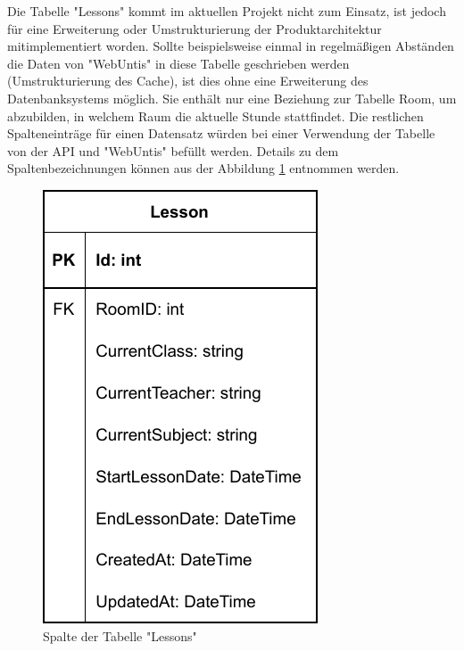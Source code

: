 
Die Tabelle "Lessons" kommt im aktuellen Projekt nicht zum Einsatz, ist jedoch für eine Erweiterung oder Umstrukturierung der Produktarchitektur mitimplementiert worden. Sollte beispielsweise einmal in regelmäßigen Abständen die Daten von "WebUntis" in diese Tabelle geschrieben werden (Umstrukturierung des Cache), ist dies ohne eine Erweiterung des Datenbanksystems möglich. Sie enthält nur eine Beziehung zur Tabelle Room, um abzubilden, in welchem Raum die aktuelle Stunde stattfindet. Die restlichen Spalteneinträge für einen Datensatz würden bei einer Verwendung der Tabelle von der API und "WebUntis" befüllt werden. Details zu dem Spaltenbezeichnungen können aus der Abbildung \ref{fig:LessonColls} entnommen werden.

\begin{figure}[H]
    \centering
    \includegraphics{media/MariaDB/Lesson.svg.pdf}
    \caption{Spalte der Tabelle "Lessons"}
    \label{fig:LessonColls}
\end{figure}

